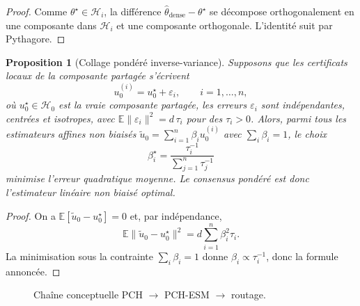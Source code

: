 \documentclass[11pt,a4paper]{article}
\newtheorem{proposition}{Proposition}[section]
\DeclareMathOperator{\argmin}{argmin}
\newcommand{\Hh}{\mathcal H}
\begin{document}
\begin{proof}
Comme \(\theta^\star\in\Hh_i\), la différence \(\hat\theta_{\mathrm{dense}}-\theta^\star\) se décompose orthogonalement en une composante dans \(\Hh_i\) et une composante orthogonale. L'identité suit par Pythagore.
\end{proof}

\begin{proposition}[Collage pondéré inverse-variance]
Supposons que les certificats locaux de la composante partagée s'écrivent
\[
u_0^{(i)} = u_0^\star + \varepsilon_i,\qquad i=1,\dots,n,
\]
où \(u_0^\star\in\Hh_0\) est la vraie composante partagée, les erreurs \(\varepsilon_i\) sont indépendantes, centrées et isotropes, avec \(\mathbb E\|\varepsilon_i\|^2 = d\,\tau_i\) pour des \(\tau_i>0\). Alors, parmi tous les estimateurs affines non biaisés \(\tilde u_0=\sum_{i=1}^n \beta_i u_0^{(i)}\) avec \(\sum_i\beta_i=1\), le choix
\[
\beta_i^\star=\frac{\tau_i^{-1}}{\sum_{j=1}^n \tau_j^{-1}}
\]
minimise l'erreur quadratique moyenne. Le consensus pondéré est donc l'estimateur linéaire non biaisé optimal.
\end{proposition}

\begin{proof}
On a \(\mathbb E[\tilde u_0-u_0^\star]=0\) et, par indépendance,
\[
\mathbb E\|\tilde u_0-u_0^\star\|^2
=
 d\sum_{i=1}^n \beta_i^2 \tau_i.
\]
La minimisation sous la contrainte \(\sum_i\beta_i=1\) donne \(\beta_i\propto \tau_i^{-1}\), donc la formule annoncée.
\end{proof}

\begin{figure}[ht]
\centering
{}
\caption{Chaîne conceptuelle PCH \(\rightarrow\) PCH-ESM \(\rightarrow\) routage.}
\end{figure}
\end{document}
